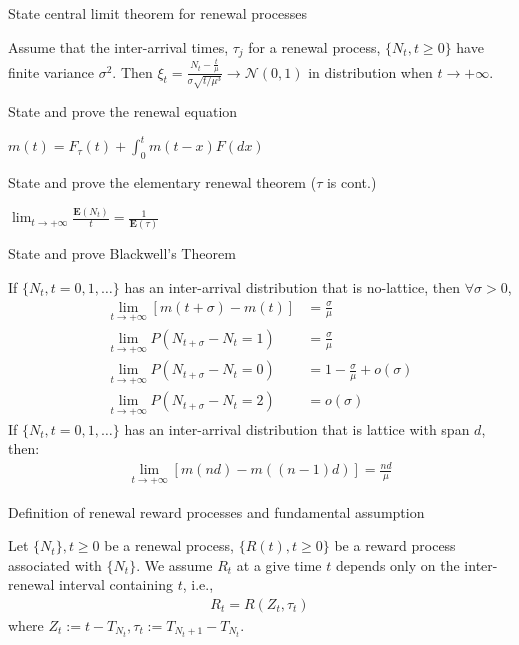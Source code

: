 \documentclass[11pt]{article}
\newcommand{\expect}[1]{\mathbf{E}(#1)}
\newcommand*{\xfield}[1]{\begin{mdframed}\centering #1\end{mdframed}\bigskip}
\newenvironment{field}{}{}
\newenvironment{note}{}{}
\begin{document}
%
\begin{note}
  \xfield{State central limit theorem for renewal processes}
  \begin{field}
    Assume that the inter-arrival times, \(\tau_j\) for a renewal
    process, \(\{N_t, t \geq 0\}\) have finite variance
    \(\sigma^2\). Then
    \(\xi_t = \frac{N_t - \frac{t}{\mu}}{\sigma \sqrt{t / \mu^3}} \to
    \mathcal{N}(0,1)\) in distribution when \(t \to +\infty\).
  \end{field}
\end{note}
%
\begin{note}
  \xfield{State and prove the renewal equation}
  \begin{field}
    \(m(t) = F_\tau(t) + \int_0^t m(t-x) F(dx)\)
  \end{field}
\end{note}
%
\begin{note}
  \xfield{State and prove the elementary renewal theorem (\(\tau\) is cont.)}
  \begin{field}
    \(\displaystyle \lim_{t \to +\infty} \frac{\expect{N_t}}{t} =
    \frac{1}{\expect{\tau}}\)
  \end{field}
\end{note}
%
\begin{note}
  \xfield{State and prove Blackwell's Theorem}
  \begin{field}
    If \(\{N_t, t = 0,1,\ldots\}\) has an inter-arrival distribution
    that is no-lattice, then \(\forall \sigma > 0\),
    \begin{align*}
      \lim_{t \to +\infty} [ m(t+\sigma) - m(t) ]
      & = \frac{\sigma}{\mu} \\
      \lim_{t \to +\infty} P(N_{t + \sigma} - N_t = 1)
      & = \frac{\sigma}{\mu} \\
      \lim_{t \to +\infty} P(N_{t+\sigma} - N_t = 0)
      & = 1 - \frac{\sigma}{\mu} + o(\sigma) \\
      \lim_{t \to +\infty} P(N_{t+\sigma} - N_t = 2)
      & = o(\sigma)
    \end{align*}
    If \(\{N_t, t = 0,1,\ldots\}\) has an inter-arrival distribution
    that is lattice with span \(d\), then:
    \begin{align*}
      \lim_{t \to +\infty} [ m(nd) - m((n-1)d)] = \frac{nd}{\mu}
    \end{align*}
  \end{field}
\end{note}
%
\begin{note}
  \xfield{Definition of renewal reward processes and fundamental assumption}
  \begin{field}
    Let \(\{N_t\}, t \geq 0\) be a renewal process, \(\{R(t), t
    \geq0\}\) be a reward process associated with \(\{N_t\}\). We
    assume \(R_t\) at a give time \(t\) depends only on the
    inter-renewal interval containing \(t\), i.e.,
    \begin{align*}
      R_t = R(Z_t, \tau_t)
    \end{align*}
    where \(Z_t := t - T_{N_t}, \tau_t := T_{N_t + 1} - T_{N_t}\).
  \end{field}
\end{note}
\end{document}
